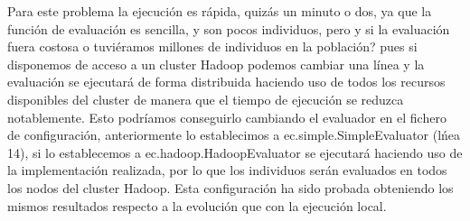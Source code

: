 Para este problema la ejecuci\'on es rápida, quizás un minuto o dos, ya que la función de evaluación es sencilla, y son pocos individuos, pero y si la evaluación fuera costosa o tuviéramos millones de individuos en la población? pues si disponemos de acceso a un cluster Hadoop podemos cambiar una l\'inea y la evaluación se ejecutar\'a de forma distribuida haciendo uso de todos los recursos disponibles del cluster de manera que el tiempo de ejecución se reduzca notablemente. Esto podríamos conseguirlo cambiando el evaluador en el fichero de configuración, anteriormente lo establecimos a ec.simple.SimpleEvaluator (l\'nea 14), si lo establecemos a ec.hadoop.HadoopEvaluator se ejecutar\'a haciendo uso de la implementación realizada, por lo que los individuos serán evaluados en todos los nodos del cluster Hadoop. Esta configuraci\'on ha sido probada obteniendo los mismos resultados respecto a la evoluci\'on que con la ejecución local.



















